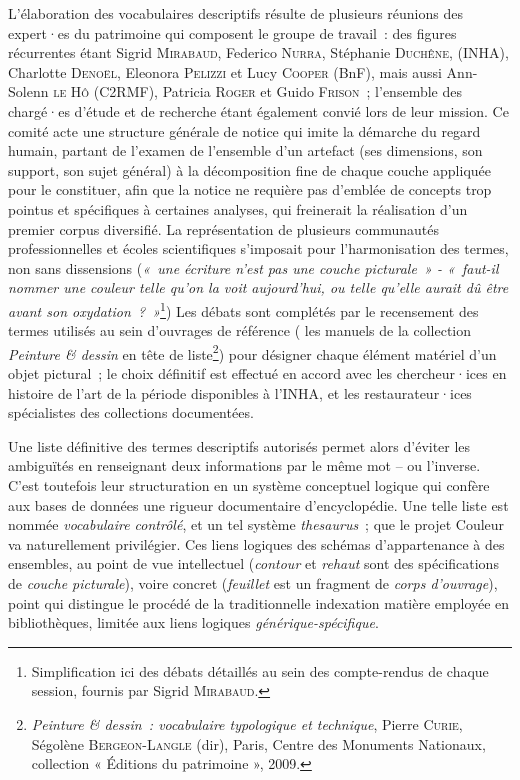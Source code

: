 \documentclass[a4paper,12pt, twoside]{book}
\begin{document}
L’élaboration des vocabulaires descriptifs résulte de plusieurs réunions des expert·es du patrimoine qui composent le groupe de travail~: des figures récurrentes étant Sigrid \textsc{Mirabaud}, Federico \textsc{Nurra}, Stéphanie \textsc{Duchêne}, (INHA), Charlotte \textsc{Denoël}, Eleonora \textsc{Pelizzi} et Lucy \textsc{Cooper} (BnF), mais aussi Ann-Solenn \textsc{le Hô} (C2RMF), Patricia \textsc{Roger} et Guido \textsc{Frison}~; l’ensemble des chargé·es d’étude et de recherche étant également convié lors de leur mission. Ce comité acte une structure générale de notice qui imite la démarche du regard humain, partant de l’examen de l’ensemble d’un artefact (ses dimensions, son support, son sujet général) à la décomposition fine de chaque couche appliquée pour le constituer, afin que la notice ne requière pas d’emblée de concepts trop pointus et spécifiques à certaines analyses, qui freinerait la réalisation d’un premier corpus diversifié. La représentation de plusieurs communautés professionnelles et écoles scientifiques s’imposait pour l’harmonisation des termes, non sans dissensions (\textit{«~une écriture n’est pas une couche picturale~» - «~faut-il nommer une couleur telle qu’on la voit aujourd’hui, ou telle qu’elle aurait dû être avant son oxydation~?~»}\footnote{Simplification ici des débats détaillés au sein des compte-rendus de chaque session, fournis par Sigrid \textsc{Mirabaud}.}) Les débats sont complétés par le recensement des termes utilisés au sein d’ouvrages de référence ( les manuels de la collection \textit{Peinture \& dessin} en tête de liste\footnote{\textit{Peinture \& dessin~: vocabulaire typologique et technique}, Pierre \textsc{Curie}, Ségolène \textsc{Bergeon-Langle} (dir), Paris, Centre des Monuments Nationaux, collection « Éditions du patrimoine », 2009.}) pour désigner chaque élément matériel d’un objet pictural~; le choix définitif est effectué en accord avec les chercheur·ices en histoire de l’art de la période disponibles à l’INHA, et les restaurateur·ices spécialistes des collections documentées.

Une liste définitive des termes descriptifs autorisés permet alors d’éviter les ambiguïtés en renseignant deux informations par le même mot – ou l’inverse. C’est toutefois leur structuration en un système conceptuel logique qui confère aux bases de données une rigueur documentaire d’encyclopédie. Une telle liste est nommée \textit{vocabulaire contrôlé}, et un tel système \textit{thesaurus}~; que le projet Couleur va naturellement privilégier. Ces liens logiques des schémas d’appartenance à des ensembles, au point de vue intellectuel (\textit{contour} et \textit{rehaut} sont des spécifications de \textit{couche picturale}), voire concret (\textit{feuillet} est un fragment de \textit{corps d’ouvrage}), point qui distingue le procédé de la traditionnelle indexation matière employée en bibliothèques, limitée aux liens logiques \textit{générique-spécifique}.
\end{document}
